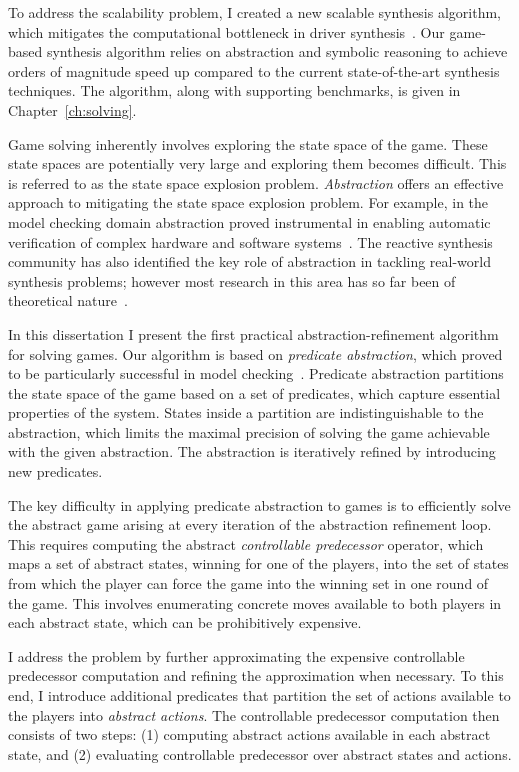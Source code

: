 To address the scalability problem, I created a new scalable synthesis algorithm, which mitigates the computational bottleneck in driver synthesis~\cite{Walker_Ryzhyk_14}. Our game-based synthesis algorithm relies on abstraction and symbolic reasoning to achieve orders of magnitude speed up compared to the current state-of-the-art synthesis techniques. The algorithm, along with supporting benchmarks, is given in Chapter~\ref{ch:solving}.

Game solving inherently involves exploring the state space of the game. These state spaces are potentially very large and exploring them becomes difficult. This is referred to as the state space explosion problem. \emph{Abstraction} offers an effective approach to mitigating the state space explosion problem.  For example, in the model checking domain abstraction proved instrumental in enabling automatic verification of complex hardware and software systems~\cite{Clarke_GJLV_00,Clarke_KSY_04,Henzinger_JMS_02}.  The reactive synthesis community has also identified the key role of abstraction in tackling real-world synthesis problems; however most research in this area has so far been of theoretical nature~\cite{Alfaro_Roy_07,Henzinger_JM_03}.  

In this dissertation I present the first practical abstraction-refinement algorithm for solving games.  Our algorithm is based on \emph{predicate abstraction}, which proved to be particularly successful in model checking~\cite{Graf_Saidi_97}.  Predicate abstraction partitions the state space of the game based on a set of predicates, which capture essential properties of the system.  States inside a partition are indistinguishable to the abstraction, which limits the maximal precision of solving the game achievable with the given abstraction.  The abstraction is iteratively refined by introducing new predicates.

The key difficulty in applying predicate abstraction to games is to efficiently solve the abstract game arising at every iteration of the abstraction refinement loop.  This requires computing the abstract \emph{controllable predecessor} operator, which maps a set of abstract states, winning for one of the players, into the set of states from which the player can force the game into the winning set in one round of the game.  This involves enumerating concrete moves available to both players in each abstract state, which can be prohibitively expensive.  

I address the problem by further approximating the expensive controllable predecessor computation and refining the approximation when necessary. To this end, I introduce additional predicates that partition the set of actions available to the players into \emph{abstract actions}.  The controllable predecessor computation then consists of two steps: (1) computing abstract actions available in each abstract state, and (2) evaluating controllable predecessor over abstract states and actions.  

